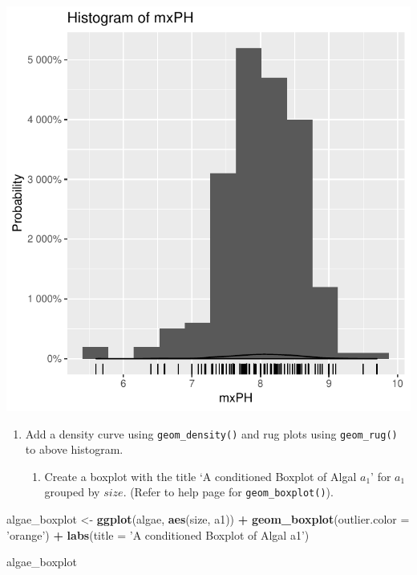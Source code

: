 \documentclass[]{article}
\newenvironment{Shaded}{\begin{snugshade}}{\end{snugshade}}
\newcommand{\KeywordTok}[1]{\textcolor[rgb]{0.13,0.29,0.53}{\textbf{#1}}}
\newcommand{\DataTypeTok}[1]{\textcolor[rgb]{0.13,0.29,0.53}{#1}}
\newcommand{\StringTok}[1]{\textcolor[rgb]{0.31,0.60,0.02}{#1}}
\newcommand{\OperatorTok}[1]{\textcolor[rgb]{0.81,0.36,0.00}{\textbf{#1}}}
\newcommand{\NormalTok}[1]{#1}
\providecommand{\tightlist}{%
  \setlength{\itemsep}{0pt}\setlength{\parskip}{0pt}}
\begin{document}
\begin{center}\includegraphics{homework1-handout_files/figure-latex/unnamed-chunk-1-1} \end{center}

\begin{enumerate}
\item
  Add a density curve using \texttt{geom\_density()} and rug plots using
  \texttt{geom\_rug()} to above histogram.

  \begin{enumerate}
  \tightlist
  \item
    Create a boxplot with the title `A conditioned Boxplot of Algal
    \(a_1\)' for \(a_1\) grouped by \(size\). (Refer to help page for
    \texttt{geom\_boxplot()}).
  \end{enumerate}
\end{enumerate}

\begin{Shaded}
\begin{Highlighting}[]
\NormalTok{algae_boxplot <-}\StringTok{ }\KeywordTok{ggplot}\NormalTok{(algae, }\KeywordTok{aes}\NormalTok{(size, a1)) }\OperatorTok{+}
\StringTok{  }\KeywordTok{geom_boxplot}\NormalTok{(}\DataTypeTok{outlier.color =} \StringTok{'orange'}\NormalTok{) }\OperatorTok{+}
\StringTok{  }\KeywordTok{labs}\NormalTok{(}\DataTypeTok{title =} \StringTok{'A conditioned Boxplot of Algal a1'}\NormalTok{)}

\NormalTok{algae_boxplot}
\end{Highlighting}
\end{Shaded}
\end{document}

